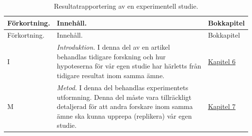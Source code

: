 \documentclass[
]{book}
\begin{document}
\begin{longtable}[]{@{}lll@{}}
\caption{\label{tab:tab-02-08-3-1}Resultatrapportering av en experimentell studie.}\tabularnewline
\toprule
\begin{minipage}[b]{0.05\columnwidth}\raggedright
Förkortning.\strut
\end{minipage} & \begin{minipage}[b]{0.78\columnwidth}\raggedright
Innehåll.\strut
\end{minipage} & \begin{minipage}[b]{0.08\columnwidth}\raggedright
Bokkapitel\strut
\end{minipage}\tabularnewline
\midrule
\endfirsthead
\toprule
\begin{minipage}[b]{0.05\columnwidth}\raggedright
Förkortning.\strut
\end{minipage} & \begin{minipage}[b]{0.78\columnwidth}\raggedright
Innehåll.\strut
\end{minipage} & \begin{minipage}[b]{0.08\columnwidth}\raggedright
Bokkapitel\strut
\end{minipage}\tabularnewline
\midrule
\endhead
\begin{minipage}[t]{0.05\columnwidth}\raggedright
I\strut
\end{minipage} & \begin{minipage}[t]{0.78\columnwidth}\raggedright
\emph{Introduktion.} I denna del av en artikel behandlas tidigare forskning och hur hypoteserna för vår egen studie har härletts från tidigare resultat inom samma ämne.\strut
\end{minipage} & \begin{minipage}[t]{0.08\columnwidth}\raggedright
\protect\hyperlink{chap06}{Kapitel 6}\strut
\end{minipage}\tabularnewline
\begin{minipage}[t]{0.05\columnwidth}\raggedright
M\strut
\end{minipage} & \begin{minipage}[t]{0.78\columnwidth}\raggedright
\emph{Metod.} I denna del behandlas experimentets utformning. Denna del måste vara tillräckligt detaljerad för att andra forskare inom samma ämne ska kunna upprepa (replikera) vår egen studie.\strut
\end{minipage} & \begin{minipage}[t]{0.08\columnwidth}\raggedright
\protect\hyperlink{chap07}{Kapitel 7}\strut
\end{minipage}\tabularnewline

\end{longtable}
\end{document}
